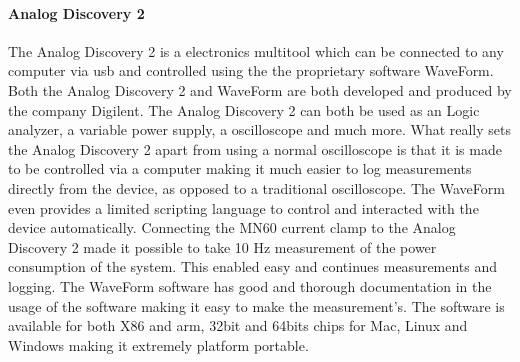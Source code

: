 \paragraph*{Analog Discovery 2}
The Analog Discovery 2 is a electronics multitool which can be connected to any computer via usb and controlled using the the proprietary software WaveForm. Both the Analog Discovery 2 and WaveForm are both developed and produced by the company Digilent. The Analog Discovery 2 can both be used as an Logic analyzer, a variable power supply, a oscilloscope and much more\cite{AnalogDoc}. What really sets the Analog Discovery 2 apart from using a normal oscilloscope is that it is made to be controlled via a computer making it much easier to log measurements directly from the device, as opposed to a traditional oscilloscope. The WaveForm even provides a limited scripting language to control and interacted with the device automatically. Connecting the MN60 current clamp to the Analog Discovery 2 made it possible to take 10 Hz measurement of the power consumption of the system. This enabled easy and continues measurements and logging. The WaveForm software has good and thorough documentation in the usage of the software making it easy to make the measurement's. The software is available for both X86 and arm, 32bit and 64bits chips for Mac, Linux and Windows making it extremely platform portable.